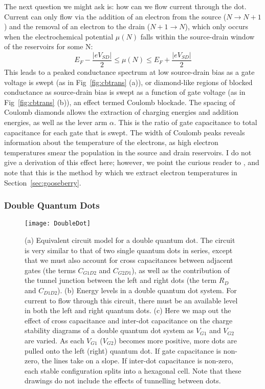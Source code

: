The next question we might ask is: how can we flow current through the dot. Current can only flow via the addition of an electron
from the source ($N \rightarrow N+1$) and the removal of an electron to the drain ($N+1 \rightarrow N$), which only occurs
when the electrochemical potential $\mu(N)$ falls within the source-drain window of the reservoirs for some N:
\begin{equation}
  E_F - \frac{|eV_{SD}|}{2} \leq \mu(N) \leq E_F + \frac{|eV_{SD}|}{2}
\end{equation}
This leads to a peaked conductance spectrum at low source-drain bias as a gate voltage is swept (as in Fig~\ref{fig:cbtrans} (a)), or
diamond-like regions of blocked conductance as source-drain bias is swept as a function of gate voltage (as in Fig~\ref{fig:cbtrans} (b)),
an effect termed Coulomb blockade. The spacing of Coulomb diamonds allows the extraction of charging energies and addition energies, as
well as the lever arm $\alpha$. This is the ratio of gate capacitance to total capacitance for each gate that is swept. The width of Coulomb
peaks reveals information about the temperature of the electrons, as high electron temperatures smear the population in
the source and drain reservoirs. I do not give a derivation of this effect here; however, we point the curious reader to \cite{grabert2013single},
and note that this is the method by which we extract electron temperatures in Section~\ref{sec:gooseberry}.

\subsubsection{Double Quantum Dots}
\begin{figure}
  \texttt{[image: DoubleDot]}
  \caption[Schematic of a double quantum dot]
  {\label{fig:dqd}(a) Equivalent circuit model for a double quantum dot. The circuit is very similar to that of
  two single quantum dots in series, except that we must also account for cross capacitances between adjacent gates
  (the terms $C_{G1D2}$ and $C_{G2D1}$), as well as the contribution of the tunnel junction between the left and
  right dots (the term $R_D$ and $C_{D1D2}$). (b) Energy levels in a double quantum dot system. For current to flow
  through this circuit, there must be an available level in both the left and right quantum dots. (c) Here we map
  out the effect of cross capacitance and inter-dot capacitance on the charge stability diagrams of a double quantum
  dot system as $V_{G1}$ and $V_{G2}$ are varied. As each $V_{G1}$ ($V_{G2}$) becomes more positive, more dots are
  pulled onto the left (right) quantum dot. If gate capacitance is non-zero, the lines take on a slope. If inter-dot
  capacitance is non-zero, each stable configuration splits into a hexagonal cell. Note that these drawings do
  not include the effects of tunnelling between dots.}
\end{figure}

